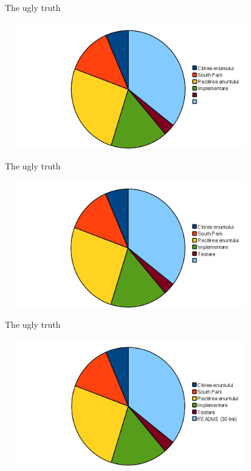 \documentclass{beamer}
\begin{document}
\begin{frame}{The ugly truth}
\begin{center}
\includegraphics[height=5.5cm, width=11cm]{Step5.png}
\end{center}
\end{frame}

\begin{frame}{The ugly truth}
\begin{center}
\includegraphics[height=5.5cm, width=11cm]{Step6.png}
\end{center}
\end{frame}

\begin{frame}{The ugly truth}
\begin{center}
\includegraphics[height=5.5cm, width=11cm]{Step7.png}
\end{center}
\end{frame}
\end{document}

